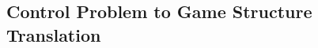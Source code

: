 \newpage
\begin{appendices}
\section{Control Problem to Game Structure Translation}
\label{appendix:cp2gs}

\end{appendices}